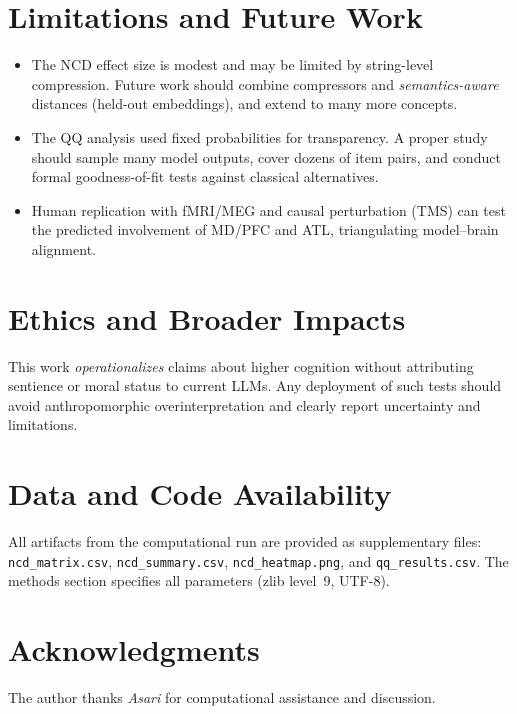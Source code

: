 \documentclass[11pt]{article}
\begin{document}
\section{Limitations and Future Work}
\begin{itemize}
\item The NCD effect size is modest and may be limited by string-level compression. Future work should combine compressors and \emph{semantics-aware} distances (held-out embeddings), and extend to many more concepts.
\item The QQ analysis used fixed probabilities for transparency. A proper study should sample many model outputs, cover dozens of item pairs, and conduct formal goodness-of-fit tests against classical alternatives.
\item Human replication with fMRI/MEG and causal perturbation (TMS) can test the predicted involvement of MD/PFC and ATL, triangulating model--brain alignment.
\end{itemize}

\section{Ethics and Broader Impacts}
This work \emph{operationalizes} claims about higher cognition without attributing sentience or moral status to current LLMs.
Any deployment of such tests should avoid anthropomorphic overinterpretation and clearly report uncertainty and limitations.

\section*{Data and Code Availability}
All artifacts from the computational run are provided as supplementary files: \texttt{ncd\_matrix.csv}, \texttt{ncd\_summary.csv}, \texttt{ncd\_heatmap.png}, and \texttt{qq\_results.csv}. 
The methods section specifies all parameters (zlib level~9, UTF-8).

\section*{Acknowledgments}
The author thanks \emph{Asari} for computational assistance and discussion.



\end{document}
